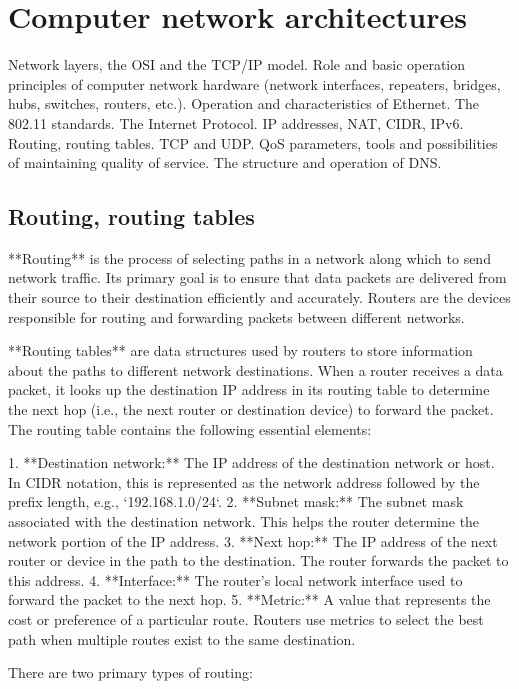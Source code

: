 \documentclass{article}
\begin{document}
\section{Computer network architectures}

Network layers, the OSI and the TCP/IP model. Role and basic operation principles of computer network hardware (network interfaces, repeaters, bridges, hubs, switches, routers, etc.). Operation and characteristics of Ethernet. The 802.11 standards. The Internet Protocol. IP addresses, NAT, CIDR, IPv6. Routing, routing tables. TCP and UDP. QoS parameters, tools and possibilities of maintaining quality of service. The structure and operation of DNS.

\subsection{Routing, routing tables}

**Routing** is the process of selecting paths in a network along which to send network traffic. Its primary goal is to ensure that data packets are delivered from their source to their destination efficiently and accurately. Routers are the devices responsible for routing and forwarding packets between different networks.

**Routing tables** are data structures used by routers to store information about the paths to different network destinations. When a router receives a data packet, it looks up the destination IP address in its routing table to determine the next hop (i.e., the next router or destination device) to forward the packet. The routing table contains the following essential elements:

1. **Destination network:** The IP address of the destination network or host. In CIDR notation, this is represented as the network address followed by the prefix length, e.g., `192.168.1.0/24`.
2. **Subnet mask:** The subnet mask associated with the destination network. This helps the router determine the network portion of the IP address.
3. **Next hop:** The IP address of the next router or device in the path to the destination. The router forwards the packet to this address.
4. **Interface:** The router's local network interface used to forward the packet to the next hop.
5. **Metric:** A value that represents the cost or preference of a particular route. Routers use metrics to select the best path when multiple routes exist to the same destination.

There are two primary types of routing:
\end{document}
